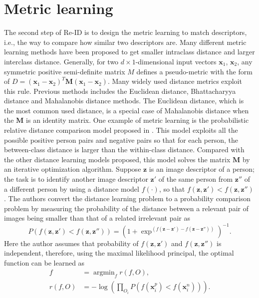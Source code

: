 \section{Metric learning}
The second step of Re-ID is to design the metric learning to match descriptors, i.e., the way to compare how similar two descriptors are. Many different metric learning methods have been proposed \cite{KISSME, LFDA, PCCA, TDL, PRDC, LMNN, KLFDA, KCCA, KernelVersionMetrics, NFST, ITML} to get smaller intraclass distance and larger interclass distance. Generally, for two $d\times 1$-dimensional input vectors $\bm{x}_1$, $\bm{x}_2$, any symmetric positive semi-definite matrix $M$ defines a pseudo-metric with the form of $D = (\bm{x}_1 -\bm{x}_2)^T\bm{M}(\bm{x}_1 - \bm{x}_2)$. Many widely used distance metrics exploit this rule. Previous methods includes the Euclidean distance, Bhattacharyya distance and Mahalanobis distance methods. The Euclidean distance, which is the most common used distance, is a special case of Mahalanobis distance when the $\bm{M}$ is an identity matrix. One example of metric learning is the probabilistic relative distance comparison model proposed in \cite{PRDC}. This model exploits all the possible positive person pairs and negative pairs so that for each person, the between-class distance is larger than the within-class distance. Compared with the other distance learning models proposed, this model solves the matrix $\bm{M}$ by an iterative optimization algorithm. Suppose $\bm{z}$ is an image descriptor of a person; the task is to identify another image descriptor $\bm{z}'$ of the same person from $\bm{z}''$ of a different person by using a distance model $f(\cdot)$, so that $f(\bm{z}, \bm{z}')< f(\bm{z}, \bm{z}'')$. The authors convert the distance learning problem to a probability comparison problem by measuring the probability of the distance between a relevant pair of images being smaller than that of a related irrelevant pair as
\begin{equation}
P(f(\bm{z},\bm{z}')<f(\bm{z},\bm{z}'')) = (1+\exp^{(f(\bm{z}-\bm{z}')-f(\bm{z}-\bm{z}''))})^{-1}.
\end{equation}
Here the author assumes that probability of $f(\bm{z},\bm{z}')$ and $f(\bm{z},\bm{z}'')$ is independent, therefore, using the maximal likelihood principal, the optimal function can be learned as
\begin{equation}
\begin{aligned}
f &= \mathop{\arg\min}_f r(f,O), \\
r(f,O) &= -\log(\prod_{O_i}P(f(\bm{x}_i^p) < f(\bm{x}_i^n))).
\end{aligned}
\end{equation}

